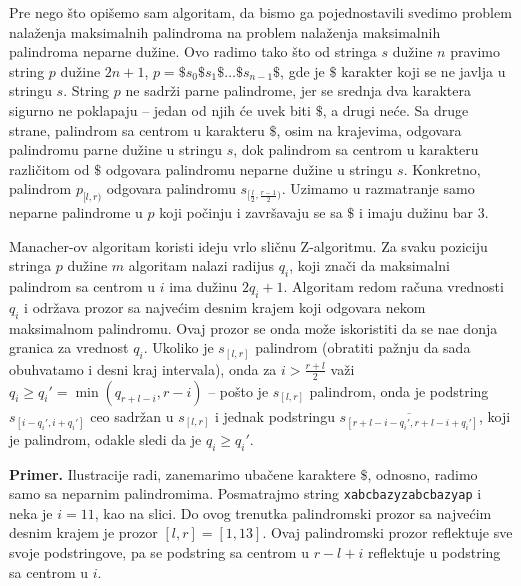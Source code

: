 Pre nego \v sto opi\v semo sam algoritam, da bismo ga pojednostavili svedimo problem nala\v zenja maksimalnih palindroma na problem nala\v zenja maksimalnih palindroma neparne du\v zine. Ovo radimo tako \v sto od stringa $s$ du\v zine $n$ pravimo string $p$ du\v zine $2n+1$, $p = \$s_0\$s_1\$\ldots \$s_{n-1}\$$, gde je $\$$ karakter koji se ne javlja u stringu $s$. String $p$ ne sadr\v zi parne palindrome, jer se srednja dva karaktera sigurno ne poklapaju -- jedan od njih \' ce uvek biti $\$$, a drugi ne\' ce. Sa druge strane, palindrom sa centrom u karakteru $\$$, osim na krajevima, odgovara palindromu parne du\v zine u stringu $s$, dok palindrom sa centrom u karakteru razli\v citom od $\$$ odgovara palindromu neparne du\v zine u stringu $s$. Konkretno, palindrom $p_{[l,r)}$ odgovara palindromu $s_{[\frac{l}{2}, \frac{r-1}{2})}$. Uzimamo u razmatranje samo neparne palindrome u $p$ koji po\v cinju i zavr\v savaju se sa $\$$ i imaju du\v zinu bar $3$.

Manacher-ov algoritam koristi ideju vrlo sli\v cnu Z-algoritmu. Za svaku poziciju stringa $p$ du\v zine $m$ algoritam nalazi radijus $q_i$, koji zna\v ci da maksimalni palindrom sa centrom u $i$ ima du\v zinu $2q_i+1$. Algoritam redom ra\v cuna vrednosti $q_i$ i odr\v zava prozor sa najve\' cim desnim krajem koji odgovara nekom maksimalnom palindromu. Ovaj prozor se onda mo\v ze iskoristiti da se na\dj e donja granica za vrednost $q_i$. Ukoliko je $s_{[l,r]}$ palindrom (obratiti pa\v znju da sada obuhvatamo i desni kraj intervala), onda za $i > \frac{r+l}{2}$ va\v zi $q_i \geq q_i' = \min(q_{r+l-i}, r-i)$ -- po\v sto je $s_{[l,r]}$ palindrom, onda je podstring $s_{[i-q_i', i+q_i']}$ ceo sadr\v zan u $s_{[l,r]}$ i jednak podstringu $\overline{s_{[r+l-i-q_i', r+l-i+q_i']}}$, koji je palindrom, odakle sledi da je $q_i \geq q_i'$.

\noindent
\begin{minipage}[l]{\textwidth}

\end{minipage}

\noindent \textbf{Primer.} Ilustracije radi, zanemarimo uba\v cene karaktere $\$$, odnosno, radimo samo sa neparnim palindromima. Posmatrajmo string \texttt{xabcbazyzabcbazyap} i neka je $i=11$, kao na slici. Do ovog trenutka palindromski prozor sa najve\' cim desnim krajem je prozor $[l,r] = [1,13]$. Ovaj palindromski prozor reflektuje sve svoje podstringove, pa se podstring sa centrom u $r-l+i$ reflektuje u podstring sa centrom u $i$.

